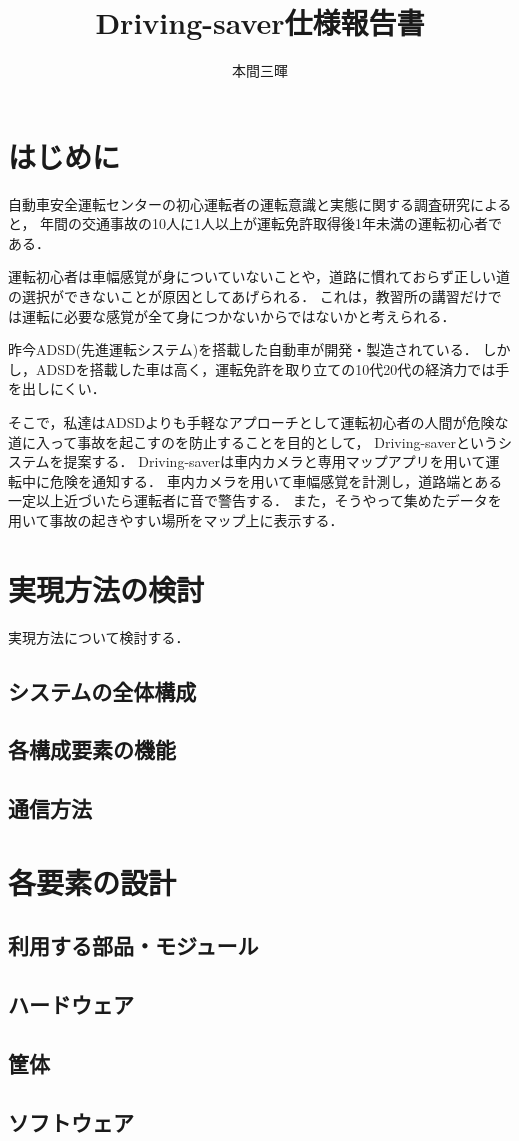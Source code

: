 \documentclass[titlepage,a4paper]{jsarticle}
\title{Driving-saver仕様報告書}
\author{本間三暉}
\begin{document}
\maketitle
\section{はじめに}
自動車安全運転センターの初心運転者の運転意識と実態に関する調査研究\cite{自動車}によると，
年間の交通事故の10人に1人以上が運転免許取得後1年未満の運転初心者である．

運転初心者は車幅感覚が身についていないことや，道路に慣れておらず正しい道の選択ができないことが原因としてあげられる．
これは，教習所の講習だけでは運転に必要な感覚が全て身につかないからではないかと考えられる．

昨今ADSD(先進運転システム)を搭載した自動車が開発・製造されている．
しかし，ADSDを搭載した車は高く，運転免許を取り立ての10代20代の経済力では手を出しにくい．

そこで，私達はADSDよりも手軽なアプローチとして運転初心者の人間が危険な道に入って事故を起こすのを防止することを目的として，
Driving-saverというシステムを提案する．
Driving-saverは車内カメラと専用マップアプリを用いて運転中に危険を通知する．
車内カメラを用いて車幅感覚を計測し，道路端とある一定以上近づいたら運転者に音で警告する．
また，そうやって集めたデータを用いて事故の起きやすい場所をマップ上に表示する．
\section{実現方法の検討}
実現方法について検討する．
\subsection{システムの全体構成}
\subsection{各構成要素の機能}
\subsection{通信方法}
\section{各要素の設計}
\subsection{利用する部品・モジュール}
\subsection{ハードウェア}
\subsection{筐体}
\subsection{ソフトウェア}

\begin{thebibliography}{99}
\end{thebibliography}
\end{document}
